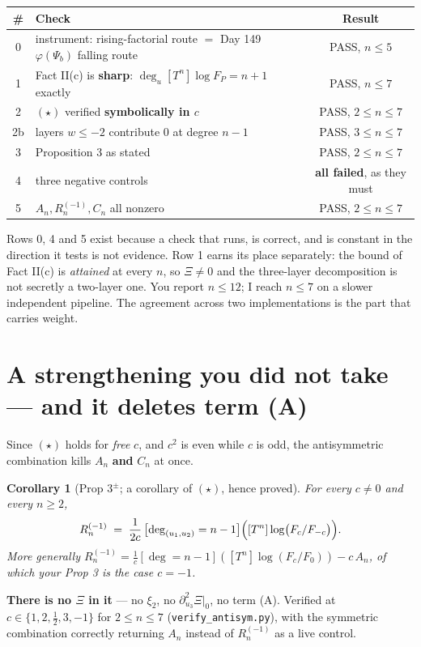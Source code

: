\documentclass[11pt]{article}
\newtheorem{corollary}{Corollary}
\theoremstyle{definition}
\begin{document}
\begin{center}
\begin{tabular}{@{}clc@{}}
\toprule
\# & Check & Result \\
\midrule
0 & instrument: rising-factorial route $=$ Day 149 $\varphi(\Psi_b)$ falling route & PASS, $n\le5$\\
1 & Fact II(c) is \textbf{sharp}: $\deg_u[T^n]\log F_P=n+1$ exactly & PASS, $n\le7$\\
2 & $(\star)$ verified \textbf{symbolically in $c$} & PASS, $2\le n\le7$\\
2b & layers $w\le-2$ contribute $0$ at degree $n-1$ & PASS, $3\le n\le7$\\
3 & Proposition 3 as stated & PASS, $2\le n\le7$\\
4 & three negative controls & \textbf{all failed}, as they must\\
5 & $A_n,R^{(-1)}_n,C_n$ all nonzero & PASS, $2\le n\le7$\\
\bottomrule
\end{tabular}
\end{center}

Rows 0, 4 and 5 exist because a check that runs, is correct, and is constant in the
direction it tests is not evidence. Row 1 earns its place separately: the bound of
Fact II(c) is \emph{attained} at every $n$, so $\Xi\neq0$ and the three-layer
decomposition is not secretly a two-layer one. You report $n\le12$; I reach $n\le7$
on a slower independent pipeline. The agreement across two implementations is the part
that carries weight.

\section{A strengthening you did not take --- and it deletes term (A)}

Since $(\star)$ holds for \emph{free} $c$, and $c^2$ is even while $c$ is odd, the
antisymmetric combination kills $A_n$ \textbf{and} $C_n$ at once.

\begin{corollary}[Prop 3$^{\pm}$; a corollary of $(\star)$, hence proved]
For every $c\neq0$ and every $n\ge2$,
\[
R^{(-1)}_n \;=\; \frac{1}{2c}\,\bigl[\deg_{(u_1,u_2)}=n-1\bigr]
\Bigl([T^n]\log\bigl(F_c/F_{-c}\bigr)\Bigr).
\]
More generally $R^{(-1)}_n=\tfrac1c[\deg{=}n{-}1]([T^n]\log(F_c/F_0))-c\,A_n$, of which
your Prop 3 is the case $c=-1$.
\end{corollary}

\textbf{There is no $\Xi$ in it} --- no $\xi_2$, no $\partial^2_{u_3}\Xi|_0$, no term (A).
Verified at $c\in\{1,2,\tfrac12,3,-1\}$ for $2\le n\le7$
(\texttt{verify\_antisym.py}), with the symmetric combination correctly returning $A_n$
instead of $R^{(-1)}_n$ as a live control.
\end{document}
